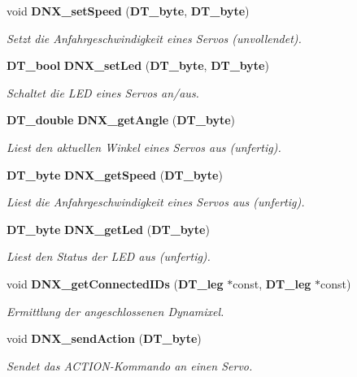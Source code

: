 \begin{DoxyCompactItemize}
void {\bf DNX\_\-setSpeed} ({\bf DT\_\-byte}, {\bf DT\_\-byte})
\begin{DoxyCompactList}\small\item\em Setzt die Anfahrgeschwindigkeit eines Servos (unvollendet). \item\end{DoxyCompactList}\item 
{\bf DT\_\-bool} {\bf DNX\_\-setLed} ({\bf DT\_\-byte}, {\bf DT\_\-byte})
\begin{DoxyCompactList}\small\item\em Schaltet die LED eines Servos an/aus. \item\end{DoxyCompactList}\item 
{\bf DT\_\-double} {\bf DNX\_\-getAngle} ({\bf DT\_\-byte})
\begin{DoxyCompactList}\small\item\em Liest den aktuellen Winkel eines Servos aus (unfertig). \item\end{DoxyCompactList}\item 
{\bf DT\_\-byte} {\bf DNX\_\-getSpeed} ({\bf DT\_\-byte})
\begin{DoxyCompactList}\small\item\em Liest die Anfahrgeschwindigkeit eines Servos aus (unfertig). \item\end{DoxyCompactList}\item 
{\bf DT\_\-byte} {\bf DNX\_\-getLed} ({\bf DT\_\-byte})
\begin{DoxyCompactList}\small\item\em Liest den Status der LED aus (unfertig). \item\end{DoxyCompactList}\item 
void {\bf DNX\_\-getConnectedIDs} ({\bf DT\_\-leg} $\ast$const, {\bf DT\_\-leg} $\ast$const)
\begin{DoxyCompactList}\small\item\em Ermittlung der angeschlossenen Dynamixel. \item\end{DoxyCompactList}\item 
void {\bf DNX\_\-sendAction} ({\bf DT\_\-byte})
\begin{DoxyCompactList}\small\item\em Sendet das ACTION-\/Kommando an einen Servo. \item\end{DoxyCompactList}\end{DoxyCompactItemize}


